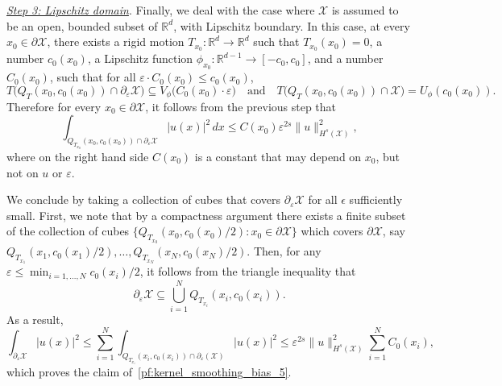 \documentclass{article}
\newcommand{\Reals}{\mathbb{R}}
\newcommand{\1}{\mathbf{1}}
\newcommand{\Rd}{\Reals^d}
\newcommand{\mc}[1]{\mathcal{#1}}
\theoremstyle{definition}
\theoremstyle{remark}
\begin{document}
\underline{\textit{Step 3: Lipschitz domain}}.
Finally, we deal with the case where $\mc{X}$ is assumed to be an open, bounded subset of $\Rd$, with Lipschitz boundary. In this case, at every $x_0 \in \partial \mc{X}$, there exists a rigid motion $T_{x_0}: \Rd \to \Rd$ such that $T_{x_0}(x_0) = 0$, a number $c_0(x_0)$, a Lipschitz function $\phi_{x_0}:\Reals^{d - 1} \to [-c_0,c_0]$, and a number $C_0(x_0)$, such that for all $\varepsilon \cdot C_0(x_0) \leq c_0(x_0)$,
\begin{equation*}
T\bigl(Q_{T}(x_0,c_0(x_0)) \cap \partial_{\varepsilon}\mc{X}\bigr) \subseteq V_{\phi}\bigl(C_0(x_0) \cdot \varepsilon\bigr) \quad\textrm{and}\quad T\bigl(Q_T(x_0,c_0(x_0)) \cap \mc{X}\bigr) = U_{\phi}(c_0(x_0)).
\end{equation*}
Therefore for every $x_0 \in \partial \mc{X}$, it follows from the previous step that
\begin{equation*}
\int_{Q_{T_{x_0}}(x_0,c_0(x_0)) \cap \partial_{\varepsilon}\mc{X}} |u(x)|^2 \,dx \leq C(x_0) \varepsilon^{2s} \|u\|_{H^s(\mc{X})}^2,
\end{equation*}
where on the right hand side $C(x_0)$ is a constant that may depend on $x_0$, but not on $u$ or $\varepsilon$.

We conclude by taking a collection of cubes that covers $\partial_{\varepsilon}\mc{X}$ for all $\epsilon$ sufficiently small. First, we note that by a compactness argument there exists a finite subset of the collection of cubes $\{Q_{T_{x_0}}(x_0,c_0(x_0)/2): x_0 \in \partial\mc{X} \}$ which covers $\partial \mc{X}$, say $Q_{T_{x_1}}(x_1,c_0(x_1)/2),\ldots, Q_{T_{x_N}}(x_N,c_0(x_N)/2)$. Then, for any $\varepsilon \leq \min_{i = 1,\ldots,N} c_0(x_i)/2$, it follows from the triangle inequality that
\begin{equation*}
\partial_{\varepsilon}\mc{X} \subseteq \bigcup_{i = 1}^{N} Q_{T_{x_i}}(x_i, c_0(x_i)).
\end{equation*}
As a result,
\begin{equation*}
\int_{\partial_{\varepsilon}\mc{X}} |u(x)|^2 \leq \sum_{i = 1}^{N} \int_{Q_{T_{x_i}}(x_i, c_0(x_i)) \cap \partial_{\varepsilon}(\mc{X})} |u(x)|^2 \leq  \varepsilon^{2s} \|u\|_{H^s(\mc{X})}^2 \sum_{i = 1}^{N}C_0(x_i),
\end{equation*}
which proves the claim of~\eqref{pf:kernel_smoothing_bias_5}.
\end{document}

